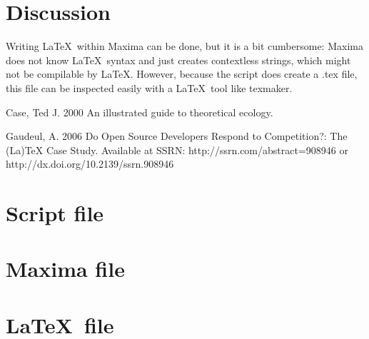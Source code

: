 \documentclass{article}
\begin{document}
\section{Discussion}

Writing \LaTeX~within Maxima can be done, but it is a bit cumbersome:
Maxima does not know \LaTeX~syntax and just creates contextless strings,
which might not be compilable by \LaTeX.
However, because the script does create a .tex file,
this file can be inspected easily with a \LaTeX~tool like texmaker.

\begin{thebibliography}{9}

  Case, Ted J.
  2000
  An illustrated guide to theoretical ecology.

  Gaudeul, A.
  2006
  Do Open Source Developers Respond to Competition?: The (La)TeX Case Study.
  Available at SSRN: http://ssrn.com/abstract=908946 or http://dx.doi.org/10.2139/ssrn.908946

\end{thebibliography}

\appendix

\section{Script file}



\section{Maxima file}



\section{\LaTeX~file}


\end{document}
